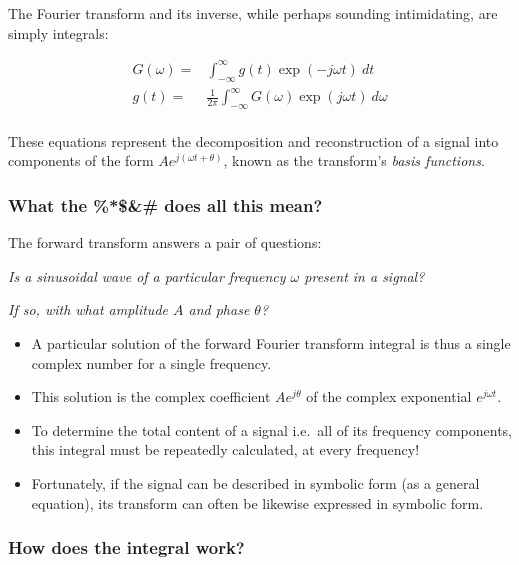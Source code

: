 \documentclass[11pt]{report}
\begin{document}
The Fourier transform and its inverse, while perhaps sounding
intimidating, are simply integrals:

\begin{equation}
\begin{split}
G(\omega) =& \int^{\infty}_{-\infty}g(t)\exp(-j\omega t)~ dt\\
g(t) =& \frac{1}{2\pi}\int^{\infty}_{-\infty}G(\omega)\exp(j\omega t)~ d\omega\\
\end{split}
\end{equation}

These equations represent the decomposition and reconstruction of a
signal into components of the form  $Ae^{j(\omega t + \theta)}$, known
as the transform's \textit{basis functions}.

\subsubsection*{What the \%*\$\&\# does all this mean?}

The forward transform answers a pair of questions:

\textit{Is a sinusoidal wave of a particular frequency 
$\omega$ present in a signal?}

\textit{If so, with what amplitude $A$ and phase $\theta$?}

\begin{itemize}
\item A particular solution of the forward Fourier transform integral
is thus a
single complex number for a single frequency.  

\item This solution is the complex coefficient $Ae^{j \theta}$ of the complex exponential $e^{j\omega t}$.

\item To determine the total content of a signal i.e.\ all of its frequency
components, this integral must be repeatedly calculated, at every frequency!

\item Fortunately, if the signal can be described in symbolic form (as
a general equation), its
transform can often be likewise expressed in symbolic form.
\end{itemize}

\subsubsection*{How does the integral work?}
\end{document}
